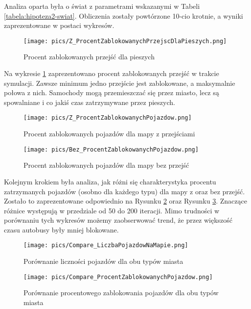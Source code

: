 \documentclass{article}
\begin{document}
Analiza oparta była o świat z parametrami wskazanymi w Tabeli \ref{tabela:hipoteza2-swiat}. Obliczenia zostały powtórzone 10-cio krotnie, a wyniki zaprezentowane w postaci wykresów.

\begin{figure}[!h]
\centering
    \texttt{[image: pics/Z\_ProcentZablokowanychPrzejscDlaPieszych.png]}
    \caption{Procent zablokowanych przejść dla pieszych}
    \label{fig:procent-zablokowanych-przejsc}
\end{figure}

Na wykresie \ref{fig:procent-zablokowanych-przejsc} zaprezentowano procent zablokowanych przejść w trakcie symulacji. Zawsze minimum jedno przejście jest zablokowane, a maksymalnie połowa z nich. Samochody mogą przemieszczać się przez miasto, lecz są spowalniane i co jakiś czas zatrzymywane przez pieszych.

\begin{figure}[!h]
\centering
    \texttt{[image: pics/Z\_ProcentZablokowanychPojazdow.png]}
    \caption{Procent zablokowanych pojazdów dla mapy z przejściami}
    \label{fig:procent-zablokowanych-pojazdow-z-przejsciami}
\end{figure}

\begin{figure}[!h]
\centering
    \texttt{[image: pics/Bez\_ProcentZablokowanychPojazdow.png]}
    \caption{Procent zablokowanych pojazdów dla mapy bez przejść}
    \label{fig:procent-zablokowanych-pojazdow-bez}
\end{figure}

Kolejnym krokiem była analiza, jak różni się charakterystyka procentu zatrzymanych pojazdów (osobno dla każdego typu) dla mapy z oraz bez przejść. Zostało to zaprezentowane odpowiednio na Rysunku \ref{fig:procent-zablokowanych-pojazdow-z-przejsciami} oraz Rysunku \ref{fig:procent-zablokowanych-pojazdow-bez}. Znaczące różnice występują w przedziale od 50 do 200 iteracji. Mimo trudności w porównaniu tych wykresów możemy zaobserwować trend, że przez większość czasu autobusy były mniej blokowane.

\begin{figure}[!h]
\centering
    \texttt{[image: pics/Compare\_LiczbaPojazdowNaMapie.png]}
    \caption{Porównanie liczności pojazdów dla obu typów miasta}
    \label{fig:porownanie-licznosci-pojazdow}
\end{figure}

\begin{figure}[!h]
\centering
    \texttt{[image: pics/Compare\_ProcentZablokowanychPojazdow.png]}
    \caption{Porównanie procentowego zablokowania pojazdów dla obu typów miasta}
    \label{fig:porownanie-zablokowane-pojazdy}
\end{figure}
\end{document}
